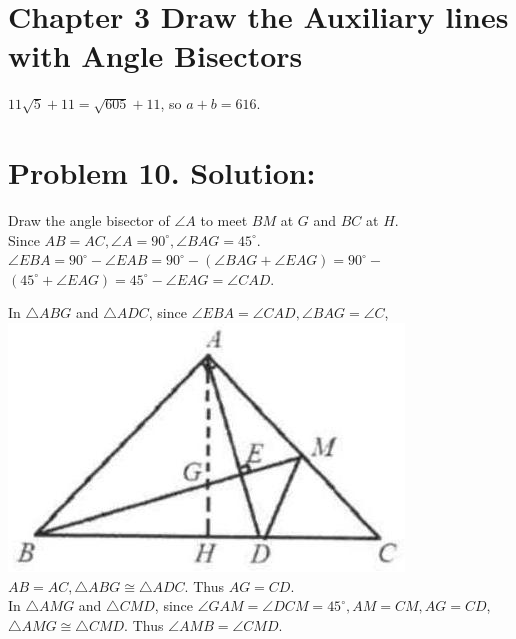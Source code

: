 \documentclass[10pt]{article}
\begin{document}
\section*{Chapter 3 Draw the Auxiliary lines with Angle Bisectors}
\(11 \sqrt{5}+11=\sqrt{605}+11\), so \(a+b=616\).

\section*{Problem 10. Solution:}
Draw the angle bisector of \(\angle A\) to meet \(B M\) at \(G\) and \(B C\) at \(H\).\\
Since \(A B=A C, \angle A=90^{\circ}, \angle B A G=45^{\circ}\).\\
\(\angle E B A=90^{\circ}-\angle E A B=90^{\circ}-(\angle B A G+\angle E A G)=90^{\circ}-\) \(\left(45^{\circ}+\angle E A G\right)=45^{\circ}-\angle E A G=\angle C A D\).

In \(\triangle A B G\) and \(\triangle A D C\), since \(\angle E B A=\angle C A D, \angle B A G=\angle C\),\\
\includegraphics[max width=\textwidth]{2025_04_17_97bc1f7e44d93c271a88g-071} \(A B=A C, \triangle A B G \cong \triangle A D C\). Thus \(A G=C D\).\\
In \(\triangle A M G\) and \(\triangle C M D\), since \(\angle G A M=\angle D C M=45^{\circ}, A M=C M, A G=C D\), \(\triangle A M G \cong \triangle C M D\). Thus \(\angle A M B=\angle C M D\).
\end{document}
